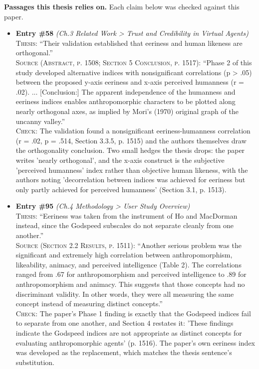 \documentclass[11pt, a4paper]{article}
\begin{document}
\textbf{Passages this thesis relies on.} Each claim below was checked against this paper.
\begin{itemize}[leftmargin=1.2em,itemsep=4pt]
\item \textbf{Entry \#58} \textit{(Ch.3 Related Work > Trust and Credibility in Virtual Agents)}\\
\textsc{Thesis:} ``Their validation established that eeriness and human likeness are orthogonal.''\\
\textsc{Source (Abstract, p. 1508; Section 5 Conclusion, p. 1517):} ``Phase 2 of this study developed alternative indices with nonsignificant correlations (p > .05) between the proposed y-axis eeriness and x-axis perceived humanness (r = .02). ... [Conclusion:] The apparent independence of the humanness and eeriness indices enables anthropomorphic characters to be plotted along nearly orthogonal axes, as implied by Mori's (1970) original graph of the uncanny valley.''\\
\textsc{Check:} The validation found a nonsignificant eeriness-humanness correlation (r = .02, p = .514, Section 3.3.5, p. 1515) and the authors themselves draw the orthogonality conclusion. Two small hedges the thesis drops: the paper writes 'nearly orthogonal', and the x-axis construct is the subjective 'perceived humanness' index rather than objective human likeness, with the authors noting 'decorrelation between indices was achieved for eeriness but only partly achieved for perceived humanness' (Section 3.1, p. 1513).
\item \textbf{Entry \#95} \textit{(Ch.4 Methodology > User Study Overview)}\\
\textsc{Thesis:} ``Eeriness was taken from the instrument of Ho and MacDorman instead, since the Godspeed subscales do not separate cleanly from one another.''\\
\textsc{Source (Section 2.2 Results, p. 1511):} ``Another serious problem was the significant and extremely high correlation between anthropomorphism, likeability, animacy, and perceived intelligence (Table 2). The correlations ranged from .67 for anthropomorphism and perceived intelligence to .89 for anthropomorphism and animacy. This suggests that those concepts had no discriminant validity. In other words, they were all measuring the same concept instead of measuring distinct concepts.''\\
\textsc{Check:} The paper's Phase 1 finding is exactly that the Godspeed indices fail to separate from one another, and Section 4 restates it: 'These findings indicate the Godspeed indices are not appropriate as distinct concepts for evaluating anthropomorphic agents' (p. 1516). The paper's own eeriness index was developed as the replacement, which matches the thesis sentence's substitution.

\end{itemize}
\end{document}
